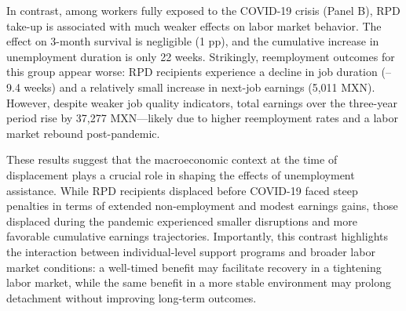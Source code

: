 \documentclass[
  4pt,
]{report}
\begin{document}
In contrast, among workers fully exposed to the COVID-19 crisis (Panel
B), RPD take-up is associated with much weaker effects on labor market
behavior. The effect on 3-month survival is negligible (1 pp), and the
cumulative increase in unemployment duration is only 22 weeks.
Strikingly, reemployment outcomes for this group appear worse: RPD
recipients experience a decline in job duration (--9.4 weeks) and a
relatively small increase in next-job earnings (5,011 MXN). However,
despite weaker job quality indicators, total earnings over the
three-year period rise by 37,277 MXN---likely due to higher reemployment
rates and a labor market rebound post-pandemic.

These results suggest that the macroeconomic context at the time of
displacement plays a crucial role in shaping the effects of unemployment
assistance. While RPD recipients displaced before COVID-19 faced steep
penalties in terms of extended non-employment and modest earnings gains,
those displaced during the pandemic experienced smaller disruptions and
more favorable cumulative earnings trajectories. Importantly, this
contrast highlights the interaction between individual-level support
programs and broader labor market conditions: a well-timed benefit may
facilitate recovery in a tightening labor market, while the same benefit
in a more stable environment may prolong detachment without improving
long-term outcomes.
\end{document}
